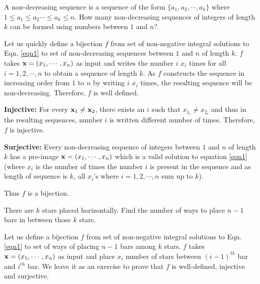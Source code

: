 \begin{problem}
\label{non-dec-subseq-prob} 
A non-decreasing sequence is a sequence of the form $\{a_1,a_2,\cdots,a_k\}$ where $1\leq a_1\leq a_2\cdots\leq a_k\leq n$.
How many non-decreasing sequences of integers of length $k$ can be formed using numbers between $1$ and $n$?. 
\end{problem}

Let us quickly define a bijection $f$ from set of non-negative integral solutions to Eqn. \ref{eqn1} to set of non-decreasing sequences between $1$ and $n$ of length $k$. $f$ takes $\mathbf{x}=(x_1,\cdots,x_n)$ as input and writes the number $i$ $x_i$ times for all $i=1,2,\cdots,n$ to obtain a sequence of length $k$. As $f$ constructs the sequence in increasing order from $1$ to $n$ by writing $i$ $x_i$ times, the resulting sequence will be non-decreasing. Therefore, $f$ is well defined.

\begin{description}
\item\textbf{Injective:} For every $\mathbf{x}_1\neq\mathbf{x}_2$, there exists an $i$ such that $x_{1_i} \neq x_{2_i}$ and thus in the resulting sequences, number $i$ is written different number of times. Therefore, $f$ is injective.
\item\textbf{Surjective:} Every non-decreasing sequence of integers between $1$ and $n$ of length $k$ has a pre-image $\mathbf{x}=(x_1,\cdots,x_n)$  which is a valid solution to equation \ref{eqn1} (where $x_i$ is the number of times the number $i$ is present in the sequence and as length of sequence is $k$, all $x_i$'s where $i=1,2,\cdots,n$ sum up to $k$).
\end{description}
Thus $f$ is a bijection.

\begin{problem}
\label{star-bar-prob} 
There are $k$ stars placed horizontally. Find the number of ways to place $n-1$ bars in between those $k$ stars.
\end{problem}

Let us define a bijection $f$ from set of non-negative integral solutions to Eqn. \ref{eqn1} to set of ways of placing $n-1$ bars among $k$ stars.
$f$ takes $\mathbf{x}=(x_1,\cdots,x_n)$ as input and place $x_i$ number of stars between $(i-1)^{th}$ bar and $i^{th}$ bar. We leave it as an exercise to prove that $f$ is well-defined, injective and surjective.

